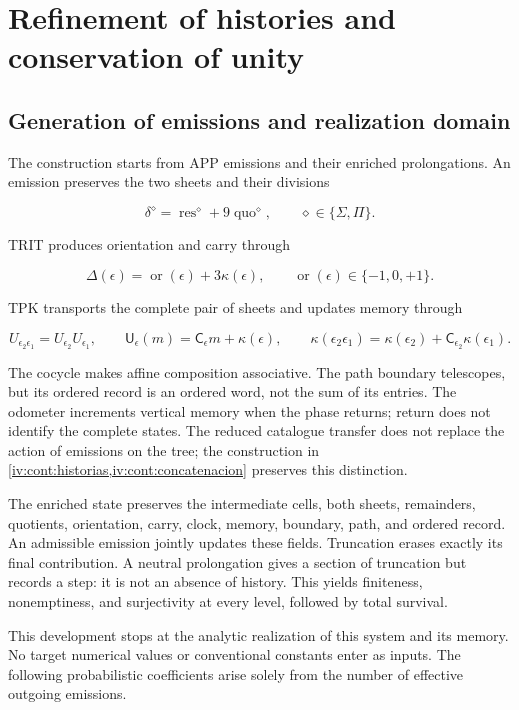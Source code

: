 \section{Refinement of histories and conservation of unity}
\label{nuclear:1}
\subsection{Generation of emissions and realization domain}

The construction starts from APP emissions and their enriched prolongations. An emission preserves the two sheets and their divisions

\[
\delta^\diamond=\operatorname{res}^\diamond+9\operatorname{quo}^\diamond,
\qquad \diamond\in\{\Sigma,\Pi\}.
\]

TRIT produces orientation and carry through

\[
\Delta(\epsilon)=\operatorname{or}(\epsilon)+3\kappa(\epsilon),
\qquad \operatorname{or}(\epsilon)\in\{-1,0,+1\}.
\]

TPK transports the complete pair of sheets and updates memory through

\[
U_{\epsilon_2\epsilon_1}=U_{\epsilon_2}U_{\epsilon_1},\qquad
\mathsf U_\epsilon(m)=\mathsf C_\epsilon m+\kappa(\epsilon),\qquad
\kappa(\epsilon_2\epsilon_1)
=\kappa(\epsilon_2)+\mathsf C_{\epsilon_2}\kappa(\epsilon_1).
\]

The cocycle makes affine composition associative. The path boundary telescopes, but its ordered record is an ordered word, not the sum of its entries. The odometer increments vertical memory when the phase returns; return does not identify the complete states. The reduced catalogue transfer does not replace the action of emissions on the tree; the construction in \cref{iv:cont:historias,iv:cont:concatenacion} preserves this distinction.

The enriched state preserves the intermediate cells, both sheets, remainders, quotients, orientation, carry, clock, memory, boundary, path, and ordered record. An admissible emission jointly updates these fields. Truncation erases exactly its final contribution. A neutral prolongation gives a section of truncation but records a step: it is not an absence of history. This yields finiteness, nonemptiness, and surjectivity at every level, followed by total survival.

This development stops at the analytic realization of this system and its memory. No target numerical values or conventional constants enter as inputs. The following probabilistic coefficients arise solely from the number of effective outgoing emissions.


